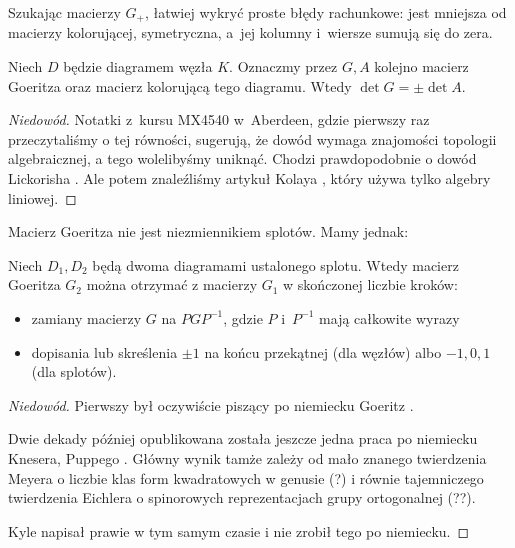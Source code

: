 Szukając macierzy $G_+$, łatwiej wykryć proste błędy rachunkowe: jest mniejsza od macierzy kolorującej, symetryczna, a~jej kolumny i~wiersze sumują się do zera.

\begin{proposition}
    Niech $D$ będzie diagramem węzła $K$.
    Oznaczmy przez $G, A$ kolejno macierz Goeritza oraz macierz kolorującą tego diagramu.
    Wtedy  $\det G = \pm \det A$.
\end{proposition}

\begin{proof}[Niedowód]
    Notatki z~kursu MX4540 w~Aberdeen, gdzie pierwszy raz przeczytaliśmy o tej równości, sugerują, że dowód wymaga znajomości topologii algebraicznej, a tego wolelibyśmy uniknąć.
    Chodzi prawdopodobnie o dowód Lickorisha \cite[s. 99]{lickorish1997}.
    Ale potem znaleźliśmy artykuł Kolaya \cite{kolay2019}, który używa tylko algebry liniowej.
\end{proof}    

Macierz Goeritza nie jest niezmiennikiem splotów.
Mamy jednak:

\begin{proposition}
    Niech $D_1, D_2$ będą dwoma diagramami ustalonego splotu.
    Wtedy macierz Goeritza $G_2$ można otrzymać z macierzy $G_1$ w skończonej liczbie kroków:
    \begin{itemize}
        \item zamiany macierzy $G$ na $PGP^{-1}$, gdzie $P$ i~$P^{-1}$ mają całkowite wyrazy
        \item dopisania lub skreślenia $\pm 1$ na końcu przekątnej (dla węzłów) albo $-1, 0, 1$ (dla splotów).
    \end{itemize}
\end{proposition}

\begin{proof}[Niedowód]
%
%
%
%
    Pierwszy był oczywiście piszący po niemiecku Goeritz \cite{goeritz1933}.

    Dwie dekady później opublikowana została jeszcze jedna praca po niemiecku Knesera, Puppego \cite{kneser1953}.
    Główny wynik tamże zależy od mało znanego twierdzenia Meyera o liczbie klas form kwadratowych w genusie (?) i równie tajemniczego twierdzenia Eichlera o spinorowych reprezentacjach grupy ortogonalnej (??).

    Kyle napisał prawie w tym samym czasie \cite{kyle1954} i nie zrobił tego po niemiecku.
\end{proof}


